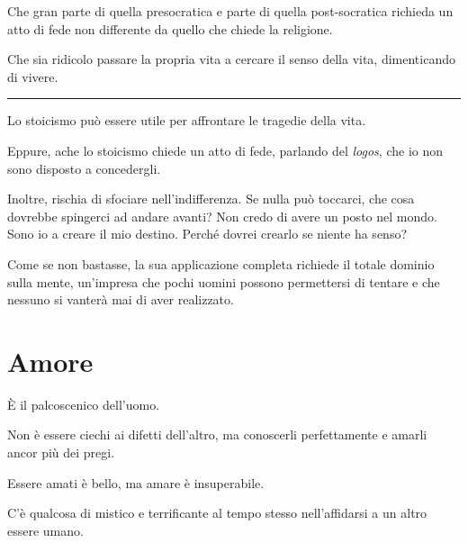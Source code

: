 \documentclass[a4paper,oneside,11pt]{memoir}
\begin{document}
Che gran parte di quella presocratica e parte di quella post-socratica richieda
un atto di fede non differente da quello che chiede la religione.

Che sia ridicolo passare la propria vita a cercare il senso della vita,
dimenticando di vivere.

\plainbreak{1}

Lo stoicismo può essere utile per affrontare le tragedie della vita.

Eppure, ache lo stoicismo chiede un atto di fede, parlando del \emph{logos}, che
io non sono disposto a concedergli.

Inoltre, rischia di sfociare nell'indifferenza. Se nulla può toccarci, che cosa
dovrebbe spingerci ad andare avanti? Non credo di avere un posto nel mondo. Sono
io a creare il mio destino. Perché dovrei crearlo se niente ha senso?

Come se non bastasse, la sua applicazione completa richiede il totale dominio
sulla mente, un'impresa che pochi uomini possono permettersi di tentare e che
nessuno si vanterà mai di aver realizzato.

\chapter{Amore}

È il palcoscenico dell'uomo.

Non è essere ciechi ai difetti dell'altro, ma conoscerli perfettamente e amarli
ancor più dei pregi.

Essere amati è bello, ma amare è insuperabile.

C'è qualcosa di mistico e terrificante al tempo stesso nell'affidarsi a un altro
essere umano.

\backmatter

\tableofcontents
\end{document}

